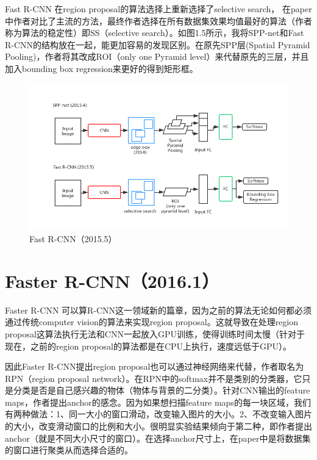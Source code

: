\documentclass[a4paper,12pt]{report}
\begin{document}
\begin{spacing}{1.5}
Fast R-CNN 在region proposal的算法选择上重新选择了selective search， 在paper中作者对比了主流的方法，最终作者选择在所有数据集效果均值最好的算法（作者称为算法的稳定性）即SS（selective search）。如图1.5所示，我将SPP-net和Fast R-CNN的结构放在一起，能更加容易的发现区别。在原先SPP层(Spatial Pyramid Pooling)，作者将其改成ROI（only one Pyramid level）来代替原先的三层，并且加入bounding box regression来更好的得到矩形框。

\begin{figure}[!h]
	\begin{center}
		\includegraphics[width=0.92\linewidth]{figure//FastRCNN.png}
		\caption{Fast R-CNN（2015.5）}
		\label{Fig:5}
	\end{center}
\end{figure}

\section{Faster R-CNN（2016.1）}
Faster R-CNN 可以算R-CNN这一领域新的篇章，因为之前的算法无论如何都必须通过传统computer vision的算法来实现region proposal。这就导致在处理region proposal这算法执行无法和CNN一起放入GPU训练，使得训练时间太慢（针对于现在，之前的region proposal的算法都是在CPU上执行，速度远低于GPU）。

因此Faster R-CNN提出region proposal也可以通过神经网络来代替，作者取名为RPN（region proposal network）。在RPN中的softmax并不是类别的分类器，它只是分类是否是自己感兴趣的物体（物体与背景的二分类）。针对CNN输出的feature maps，作者提出anchor的感念。因为如果想扫描feature maps的每一块区域，我们有两种做法：1、同一大小的窗口滑动，改变输入图片的大小。2、不改变输入图片的大小，改变滑动窗口的比例和大小。很明显实验结果倾向于第二种，即作者提出anchor（就是不同大小尺寸的窗口）。在选择anchor尺寸上，在paper中是将数据集的窗口进行聚类从而选择合适的。


\end{spacing}
\end{document}

